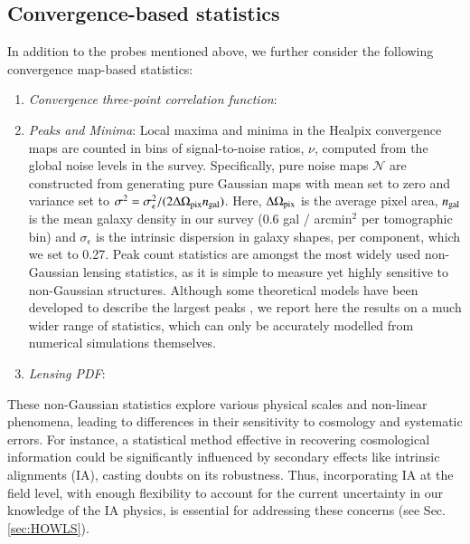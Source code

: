 \subsection{Convergence-based statistics}

In addition to the probes mentioned above, we further consider the following convergence map-based statistics:
\begin{enumerate}
    \item \textit{Convergence three-point correlation function}: 
    \item \textit{Peaks and Minima}: Local maxima and minima in the {\sc Healpix} convergence maps are counted in bins of signal-to-noise ratios, $\nu$, computed from the global  noise levels in the survey. Specifically, pure noise maps $\mathcal{N}$ are constructed from generating pure Gaussian maps with mean set to zero and variance set to $\sigma^2 =  \sigma_\epsilon^2 / (2 \Delta \Omega_{\rm pix} n_{\rm gal})$. Here, $\Delta \Omega_{\rm pix}$ is the average pixel area, $n_{\rm gal}$ is the mean galaxy density in our survey (0.6 gal / arcmin$^2$ per tomographic bin)  and $\sigma_\epsilon$ is the intrinsic dispersion in galaxy shapes, per component, which we set to 0.27.
   Peak count statistics are amongst the most widely used non-Gaussian lensing statistics, as it is simple to measure yet highly sensitive to non-Gaussian structures.
    Although some theoretical models have been developed to describe the largest peaks \citep[see][]{Shan18, HSCY1_Peaks_th}, we report here the results on a much wider range of statistics, which can only be accurately modelled from numerical simulations themselves.
    \item \textit{Lensing PDF}:  
\end{enumerate}

These non-Gaussian statistics explore various physical scales and non-linear phenomena, leading to differences in their sensitivity to cosmology and systematic errors.
For instance, a statistical method effective in recovering cosmological information could be significantly influenced by secondary effects like intrinsic alignments (IA), casting doubts on its robustness.
Thus, incorporating IA  at the field level, with enough flexibility to account for the current uncertainty in our knowledge of the IA physics,  is essential for addressing these concerns (see Sec. \ref{sec:HOWLS}). 

